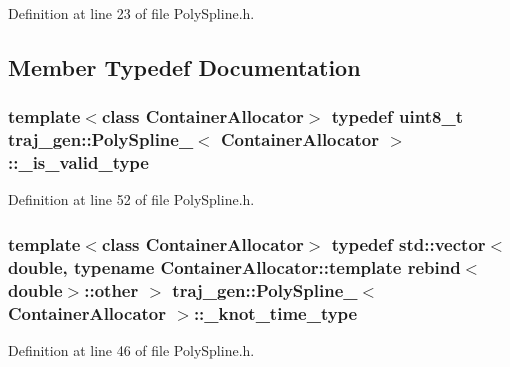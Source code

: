 Definition at line 23 of file Poly\+Spline.\+h.



\subsection{Member Typedef Documentation}
\subsubsection[{\texorpdfstring{\+\_\+is\+\_\+valid\+\_\+type}{_is_valid_type}}]{\setlength{\rightskip}{0pt plus 5cm}template$<$class Container\+Allocator$>$ typedef uint8\+\_\+t {\bf traj\+\_\+gen\+::\+Poly\+Spline\+\_\+}$<$ Container\+Allocator $>$\+::{\bf \+\_\+is\+\_\+valid\+\_\+type}}\hypertarget{structtraj__gen_1_1_poly_spline___a0176a14c07afec73c6cc8860ba90af3c}{}\label{structtraj__gen_1_1_poly_spline___a0176a14c07afec73c6cc8860ba90af3c}


Definition at line 52 of file Poly\+Spline.\+h.

\subsubsection[{\texorpdfstring{\+\_\+knot\+\_\+time\+\_\+type}{_knot_time_type}}]{\setlength{\rightskip}{0pt plus 5cm}template$<$class Container\+Allocator$>$ typedef std\+::vector$<$double, typename Container\+Allocator\+::template rebind$<$double$>$\+::other $>$ {\bf traj\+\_\+gen\+::\+Poly\+Spline\+\_\+}$<$ Container\+Allocator $>$\+::{\bf \+\_\+knot\+\_\+time\+\_\+type}}\hypertarget{structtraj__gen_1_1_poly_spline___a7826607c170993b6a3846b1d9696c60e}{}\label{structtraj__gen_1_1_poly_spline___a7826607c170993b6a3846b1d9696c60e}


Definition at line 46 of file Poly\+Spline.\+h.


